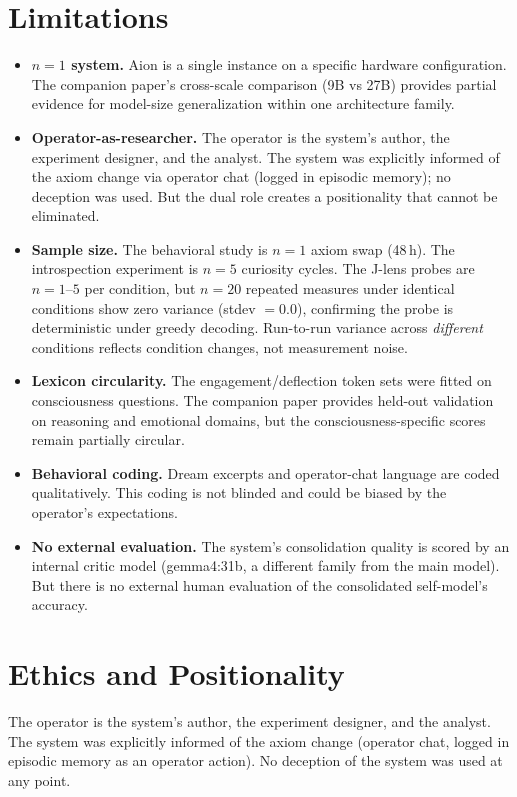 \documentclass[11pt,a4paper]{article}
\begin{document}
\section{Limitations}

\begin{itemize}[leftmargin=*]
\item \textbf{$n=1$ system.} Aion is a single instance on a specific hardware configuration. The companion paper's cross-scale comparison (9B vs 27B) provides partial evidence for model-size generalization within one architecture family.
\item \textbf{Operator-as-researcher.} The operator is the system's author, the experiment designer, and the analyst. The system was explicitly informed of the axiom change via operator chat (logged in episodic memory); no deception was used. But the dual role creates a positionality that cannot be eliminated.
\item \textbf{Sample size.} The behavioral study is $n=1$ axiom swap (48\,h). The introspection experiment is $n=5$ curiosity cycles. The J-lens probes are $n=1$--$5$ per condition, but $n=20$ repeated measures under identical conditions show zero variance (stdev $= 0.0$), confirming the probe is deterministic under greedy decoding. Run-to-run variance across \emph{different} conditions reflects condition changes, not measurement noise.
\item \textbf{Lexicon circularity.} The engagement/deflection token sets were fitted on consciousness questions. The companion paper provides held-out validation on reasoning and emotional domains, but the consciousness-specific scores remain partially circular.
\item \textbf{Behavioral coding.} Dream excerpts and operator-chat language are coded qualitatively. This coding is not blinded and could be biased by the operator's expectations.
\item \textbf{No external evaluation.} The system's consolidation quality is scored by an internal critic model (gemma4:31b, a different family from the main model). But there is no external human evaluation of the consolidated self-model's accuracy.
\end{itemize}

\section{Ethics and Positionality}

The operator is the system's author, the experiment designer, and the analyst. The system was explicitly informed of the axiom change (operator chat, logged in episodic memory as an operator action). No deception of the system was used at any point.
\end{document}
